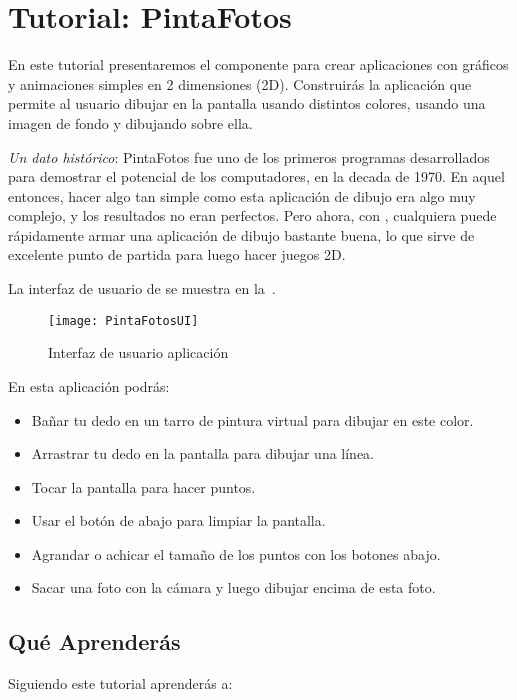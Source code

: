 \section{Tutorial: PintaFotos}

En este tutorial presentaremos el componente  para
crear aplicaciones con gráficos y animaciones simples en 2 dimensiones
(2D). Construirás la aplicación  que permite al
usuario dibujar en la pantalla usando distintos colores, usando una
imagen de fondo y dibujando sobre ella.

\emph{Un dato histórico}: PintaFotos fue uno de los primeros programas
desarrollados para demostrar el potencial de los computadores, en la
decada de 1970. En aquel entonces, hacer algo tan simple como esta
aplicación de dibujo era algo muy complejo, y los resultados no eran
perfectos. Pero ahora, con \AppInventor, cualquiera puede rápidamente
armar una aplicación de dibujo bastante buena, lo que sirve de
excelente punto de partida para luego hacer juegos 2D.

La interfaz de usuario de  se muestra en
la~.

\begin{figure}[H]
\centering
\texttt{[image: PintaFotosUI]}
\caption{Interfaz de usuario aplicación }
\label{fig:appUI}
\end{figure}

En esta aplicación podrás:

\begin{itemize}
\item Bañar tu dedo en un tarro de pintura virtual para dibujar en
  este color.
\item Arrastrar tu dedo en la pantalla para dibujar una línea.
\item Tocar la pantalla para hacer puntos.
\item Usar el botón de abajo para limpiar la pantalla.
\item Agrandar o achicar el tamaño de los puntos con los botones
  abajo.
\item Sacar una foto con la cámara y luego dibujar encima de esta foto.
\end{itemize}

\subsection*{Qué Aprenderás}

Siguiendo este tutorial aprenderás a:

